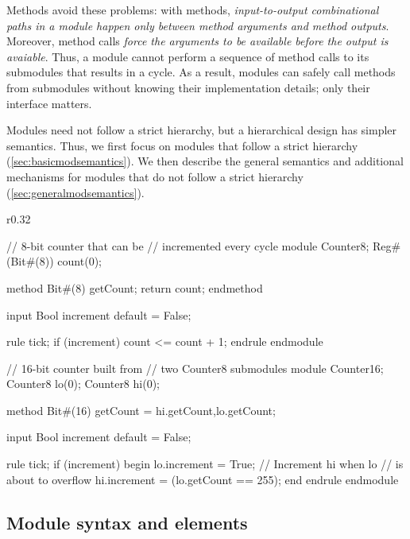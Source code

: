 Methods avoid these problems: with methods,
\emph{input-to-output combinational paths in a module happen only between method arguments and method outputs}.
Moreover, method calls \emph{force the arguments to be available before the output is avaiable}.
Thus, a module cannot perform a sequence of method calls to its submodules that results in a cycle.
As a result, modules can safely call methods from submodules without knowing their implementation details;
only their interface matters.

Modules need not follow a strict hierarchy, but a hierarchical design has simpler semantics.
Thus, we first focus on modules that follow a strict hierarchy (\autoref{sec:basicmodsemantics}). %
We then describe the general semantics and additional mechanisms for modules that do not follow a strict hierarchy (\autoref{sec:generalmodsemantics}).

\begin{wrapfigure}{r}{0.32\columnwidth}
\vspace{-4em}
\begin{mscode}
// 8-bit counter that can be
// incremented every cycle
module Counter8;
  Reg#(Bit#(8)) count(0);

  method Bit#(8) getCount;
    return count;
  endmethod

  input Bool increment
    default = False;

  rule tick;
    if (increment)
      count <= count + 1;
  endrule
endmodule

// 16-bit counter built from 
// two Counter8 submodules
module Counter16;
  Counter8 lo(0);
  Counter8 hi(0);

  method Bit#(16) getCount =
   {hi.getCount,lo.getCount};

  input Bool increment
    default = False;

  rule tick;
    if (increment) begin
      lo.increment = True;
      // Increment hi when lo
      // is about to overflow
      hi.increment =
       (lo.getCount == 255);
    end
  endrule
endmodule
\end{mscode}
\vspace{-9em}
\end{wrapfigure}

\subsection{Module syntax and elements}
\label{sec:modulesyntax}
\label{sec:submodules}

